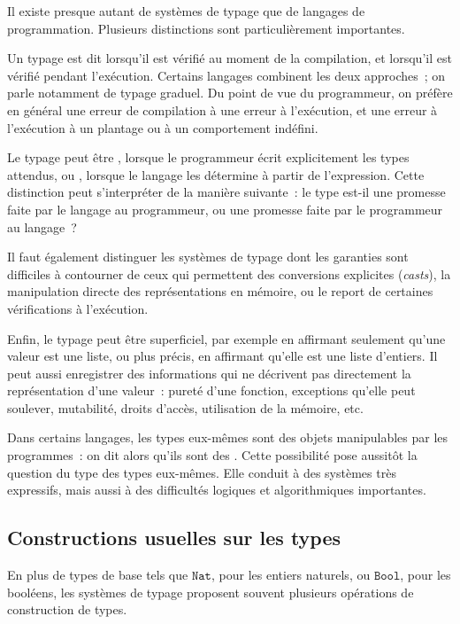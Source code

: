 \thingy Il existe presque autant de systèmes de typage que de langages
de programmation. Plusieurs distinctions sont particulièrement
importantes.

Un typage est dit  lorsqu'il est vérifié au moment de la
compilation, et  lorsqu'il est vérifié pendant
l'exécution. Certains langages combinent les deux approches ; on parle
notamment de typage graduel. Du point de vue du programmeur, on préfère
en général une erreur de compilation à une erreur à l'exécution, et une
erreur à l'exécution à un plantage ou à un comportement indéfini.

Le typage peut être , lorsque le programmeur écrit
explicitement les types attendus, ou , lorsque le langage
les détermine à partir de l'expression. Cette distinction peut
s'interpréter de la manière suivante : le type est-il une promesse
faite par le langage au programmeur, ou une promesse faite par le
programmeur au langage ?

Il faut également distinguer les systèmes de typage dont les garanties
sont difficiles à contourner de ceux qui permettent des conversions
explicites (\textit{casts}), la manipulation directe des
représentations en mémoire, ou le report de certaines vérifications à
l'exécution.

Enfin, le typage peut être superficiel, par exemple en affirmant
seulement qu'une valeur est une liste, ou plus précis, en affirmant
qu'elle est une liste d'entiers. Il peut aussi enregistrer des
informations qui ne décrivent pas directement la représentation d'une
valeur : pureté d'une fonction, exceptions qu'elle peut soulever,
mutabilité, droits d'accès, utilisation de la mémoire, etc.

\thingy Dans certains langages, les types eux-mêmes sont des objets
manipulables par les programmes : on dit alors qu'ils sont des
. Cette possibilité pose aussitôt la
question du type des types eux-mêmes. Elle conduit à des systèmes très
expressifs, mais aussi à des difficultés logiques et algorithmiques
importantes.

\subsection{Constructions usuelles sur les types}

\thingy En plus de types de base tels que $\texttt{Nat}$, pour les
entiers naturels, ou $\texttt{Bool}$, pour les booléens, les systèmes de
typage proposent souvent plusieurs opérations de construction de
types.


